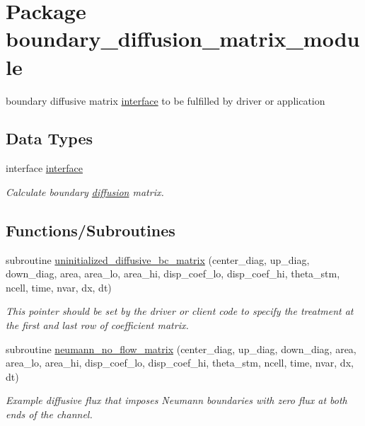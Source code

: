 \hypertarget{a00055}{
\section{Package boundary\_\-diffusion\_\-matrix\_\-module}
\label{a00055}
}
boundary diffusive matrix \hyperlink{a00003}{interface} to be fulfilled by driver or application  


\subsection*{Data Types}
\begin{CompactItemize}
\item 
interface \hyperlink{a00003}{interface}
\begin{CompactList}\small\item\em Calculate boundary \hyperlink{a00056}{diffusion} matrix. \item\end{CompactList}\end{CompactItemize}
\subsection*{Functions/Subroutines}
\begin{CompactItemize}
\item 
subroutine \hyperlink{a00055_1519a5a563e79c544b761ce6f9e5e55f}{uninitialized\_\-diffusive\_\-bc\_\-matrix} (center\_\-diag, up\_\-diag, down\_\-diag, area, area\_\-lo, area\_\-hi, disp\_\-coef\_\-lo, disp\_\-coef\_\-hi, theta\_\-stm, ncell, time, nvar, dx, dt)
\begin{CompactList}\small\item\em This pointer should be set by the driver or client code to specify the treatment at the first and last row of coefficient matrix. \item\end{CompactList}\item 
subroutine \hyperlink{a00055_bfeec91e611887da43beb5b8a58614fc}{neumann\_\-no\_\-flow\_\-matrix} (center\_\-diag, up\_\-diag, down\_\-diag, area, area\_\-lo, area\_\-hi, disp\_\-coef\_\-lo, disp\_\-coef\_\-hi, theta\_\-stm, ncell, time, nvar, dx, dt)
\begin{CompactList}\small\item\em Example diffusive flux that imposes Neumann boundaries with zero flux at both ends of the channel. \item\end{CompactList}\end{CompactItemize}


